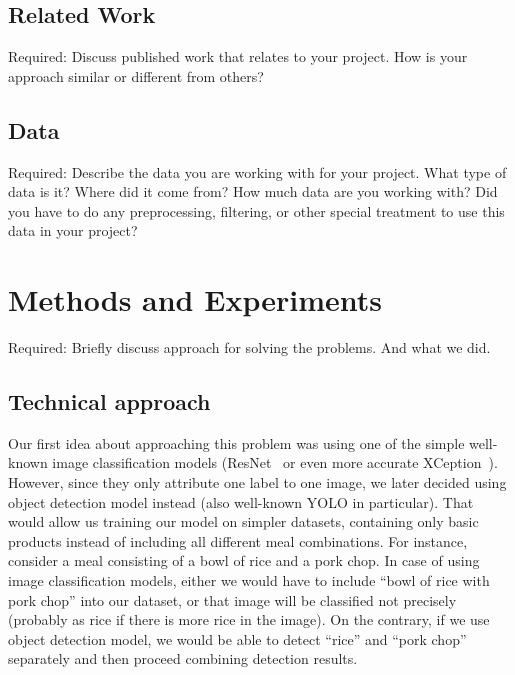 \documentclass[10pt,twocolumn,letterpaper]{article}
\begin{document}
\subsection{Related Work}

Required: Discuss published work that relates to your project. How is your approach similar or different from others?

\subsection{Data}

Required: Describe the data you are working with for your project. 
What type of data is it? 
Where did it come from? 
How much data are you working with? 
Did you have to do any preprocessing, filtering, or other special treatment to use this data in your project?



\section{Methods and Experiments}
Required: Briefly discuss approach for solving the problems. And what we did.

\subsection{Technical approach}

Our first idea about approaching this problem was using one of the simple well-known image classification models (ResNet~\cite{he2015deepresiduallearningimage} or even more accurate XCeption~\cite{chollet2017xceptiondeeplearningdepthwise}).
However, since they only attribute one label to one image, we later decided using object detection model instead (also well-known YOLO in particular).
That would allow us training our model on simpler datasets, containing only basic products instead of including all different meal combinations.
For instance, consider a meal consisting of a bowl of rice and a pork chop.
In case of using image classification models, either we would have to include ``bowl of rice with pork chop'' into our dataset, or that image will be classified not precisely (probably as rice if there is more rice in the image).
On the contrary, if we use object detection model, we would be able to detect ``rice'' and ``pork chop'' separately and then proceed combining detection results.
\end{document}
